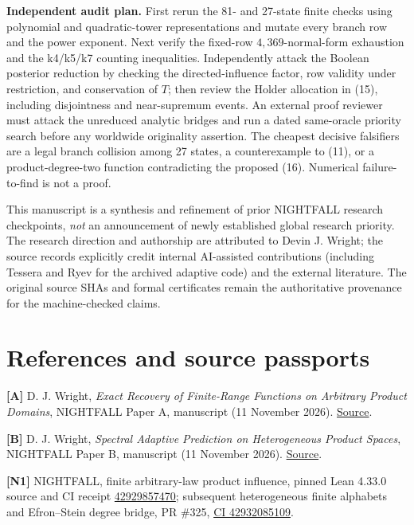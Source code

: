 \documentclass[
  10pt,
]{article}
\begin{document}
\textbf{Independent audit plan.} First rerun the 81- and 27-state finite
checks using polynomial and quadratic-tower representations and mutate
every branch row and the power exponent. Next verify the fixed-row
\(4,369\)-normal-form exhaustion and the k4/k5/k7 counting inequalities.
Independently attack the Boolean posterior reduction by checking the
directed-influence factor, row validity under restriction, and
conservation of \(T\); then review the Holder allocation in (15),
including disjointness and near-supremum events. An external proof
reviewer must attack the unreduced analytic bridges and run a dated
same-oracle priority search before any worldwide originality assertion.
The cheapest decisive falsifiers are a legal branch collision among 27
states, a counterexample to (11), or a product-degree-two function
contradicting the proposed (16). Numerical failure-to-find is not a
proof.

This manuscript is a synthesis and refinement of prior NIGHTFALL
research checkpoints, \emph{not} an announcement of newly established
global research priority. The research direction and authorship are
attributed to Devin J. Wright; the source records explicitly credit
internal AI-assisted contributions (including Tessera and Ryev for the
archived adaptive code) and the external literature. The original source
SHAs and formal certificates remain the authoritative provenance for the
machine-checked claims.

\section{References and source
passports}\label{references-and-source-passports}

\textbf{{[}A{]}} D. J. Wright, \emph{Exact Recovery of Finite-Range
Functions on Arbitrary Product Domains}, NIGHTFALL Paper A, manuscript
(11 November 2026).
\href{https://github.com/d3lefts/d3lefts/blob/main/papers/exact-recovery/MANUSCRIPT.md}{Source}.

\textbf{{[}B{]}} D. J. Wright, \emph{Spectral Adaptive Prediction on
Heterogeneous Product Spaces}, NIGHTFALL Paper B, manuscript (11
November 2026).
\href{https://github.com/d3lefts/d3lefts/blob/main/papers/spectral-adaptive-prediction/MANUSCRIPT.md}{Source}.

\textbf{{[}N1{]}} NIGHTFALL, finite arbitrary-law product influence,
pinned Lean 4.33.0 source and CI receipt
\href{https://github.com/d3lefts/d3lefts/actions/runs/42929857470}{42929857470};
subsequent heterogeneous finite alphabets and Efron--Stein degree
bridge, PR \#325,
\href{https://github.com/d3lefts/d3lefts/actions/runs/42932085109}{CI
42932085109}.
\end{document}
